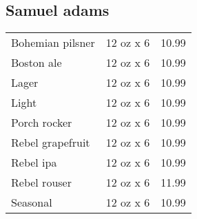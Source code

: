 \documentclass{article}%
\begin{document}
\begin{multicols}{3}
%
\subsection*{Samuel adams}%
\begin{tabular}{l c r}%
Bohemian pilsner&12 oz x 6&10.99\\%
Boston ale&12 oz x 6&10.99\\%
Lager&12 oz x 6&10.99\\%
Light&12 oz x 6&10.99\\%
Porch rocker&12 oz x 6&10.99\\%
Rebel grapefruit&12 oz x 6&10.99\\%
Rebel ipa&12 oz x 6&10.99\\%
Rebel rouser&12 oz x 6&11.99\\%
Seasonal&12 oz x 6&10.99\\%
\end{tabular}

%
\end{multicols}%
\end{document}
